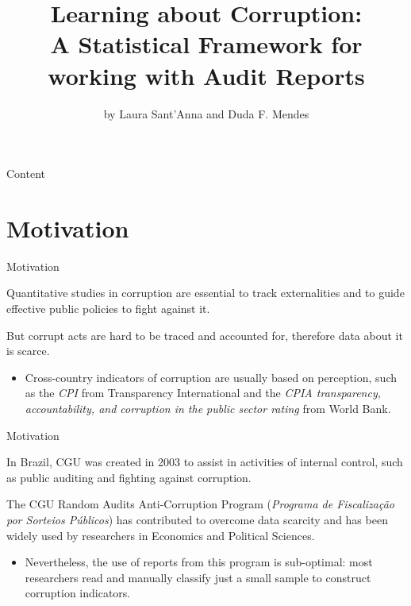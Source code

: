 \documentclass[handout,t,usenames,dvipsnames]{beamer}
\date{}
\title{\large{Learning about Corruption:} \\ 
\vspace{1em}
\large{A Statistical Framework for working with Audit Reports}}
\date{}
\author{by Laura Sant'Anna and Duda F. Mendes}
\begin{document}

\frame{\titlepage}
\section[]{}
\begin{frame}{Content}
\tableofcontents
\end{frame}




\section{Motivation}


\begin{frame}{Motivation}
\vspace{1em}
\onehalfspacing

Quantitative studies in corruption are essential to track externalities and to guide effective public policies to fight against it.
\vspace{1em}

But corrupt acts are hard to be traced and accounted for, therefore data about it is scarce.

\vspace{1em}
\begin{itemize}
\item Cross-country indicators of corruption are usually based on perception, such as the \textit{CPI} from Transparency International and the \textit{CPIA transparency, accountability, and corruption in the public sector rating} from World Bank.
\end{itemize}

\end{frame}

\begin{frame}{Motivation}

\justifying
\vspace{1em}

In Brazil, CGU was created in 2003 to assist in activities of internal control, such as public auditing and fighting against corruption.
\vspace{2em}

The CGU Random Audits Anti-Corruption Program (\textit{Programa de Fiscalização por Sorteios Públicos}) has contributed to overcome data scarcity and has been widely used by researchers in Economics and Political Sciences.
\vspace{1em}

\begin{itemize}
    \item Nevertheless, the use of reports from this program is sub-optimal: most researchers read and manually classify just a small sample to construct corruption indicators.
\end{itemize}

\end{frame}
\end{document}
